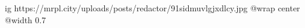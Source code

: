  
 
 
 
 

\ifcmt
  ig https://mrpl.city/uploads/posts/redactor/91sidmuvlgjxdlcy.jpg
  @wrap center
  @width 0.7
\fi
